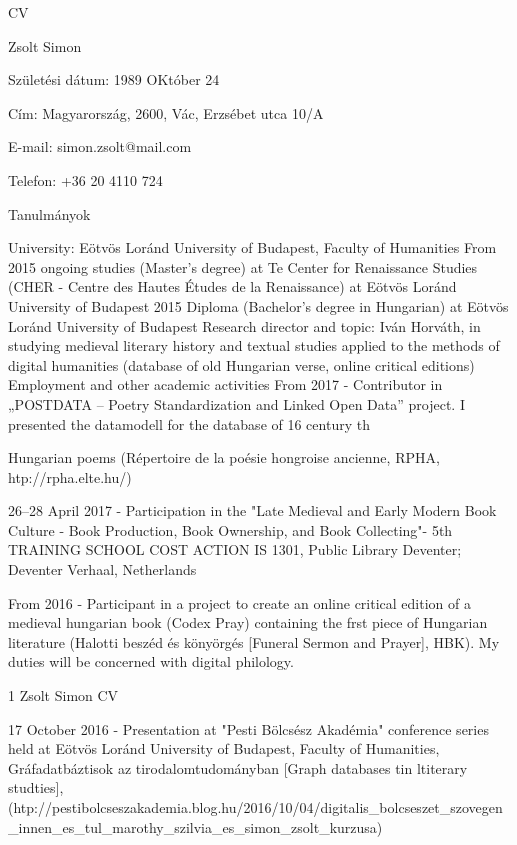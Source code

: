 \documentclass{article}
\begin{document}
CV

Zsolt Simon

Születési dátum: 1989 OKtóber 24

Cím: Magyarország, 2600, Vác, Erzsébet utca 10/A

E-mail: simon.zsolt@mail.com

Telefon: +36 20 4110 724

Tanulmányok

University: Eötvös Loránd University of Budapest, Faculty of Humanities
      From 2015 ongoing studies (Master's degree) at Te Center for Renaissance
       Studies (CHER - Centre des Hautes Études de la Renaissance) at Eötvös Loránd
       University of Budapest
      2015 Diploma (Bachelor's degree in Hungarian) at Eötvös Loránd University of
       Budapest
      Research director and topic: Iván Horváth, in studying medieval literary
       history and textual studies applied to the methods of digital humanities
       (database of old Hungarian verse, online critical editions)
Employment and other academic activities
      From 2017 - Contributor in „POSTDATA – Poetry Standardization and Linked
       Open Data” project. I presented the datamodell for the database of 16 century
                                                                            th

       Hungarian poems (Répertoire de la poésie hongroise ancienne, RPHA,
       htp://rpha.elte.hu/)

      26–28 April 2017 - Participation in the "Late Medieval and Early Modern Book
       Culture - Book Production, Book Ownership, and Book Collecting"- 5th
       TRAINING SCHOOL COST ACTION IS 1301, Public Library Deventer;
       Deventer Verhaal, Netherlands

      From 2016 - Participant in a project to create an online critical edition of a
       medieval hungarian book (Codex Pray) containing the frst piece of Hungarian
       literature (Halotti beszéd és könyörgés [Funeral Sermon and Prayer], HBK). My
       duties will be concerned with digital philology.




                                             1
Zsolt Simon                                                                           CV

      17 October 2016 - Presentation at "Pesti Bölcsész Akadémia" conference series
       held at Eötvös Loránd University of Budapest, Faculty of Humanities,
       Gráfadatbáztisok az tirodalomtudományban [Graph databases tin ltiterary studties],
       (htp://pestibolcseszakademia.blog.hu/2016/10/04/digitalis\_bolcseszet\_szovegen\_innen\_es\_tul\_marothy\_szilvia\_es\_simon\_zsolt\_kurzusa)
\end{document}

